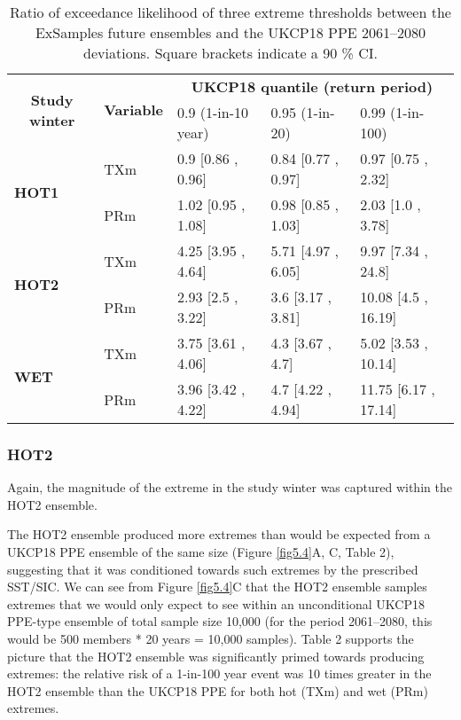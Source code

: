       \begin{table}[h]
        \centering
        \footnotesize
        \begin{tabular}{lllll}
          \toprule
          \multicolumn{1}{c}{\multirow{2}{*}{\textbf{Study winter}}}&\multicolumn{1}{c}{\multirow{2}{*}{\textbf{Variable}}}&\multicolumn{3}{c}{\textbf{UKCP18 quantile (return period)}}\\\cmidrule(lr){3-5}
          \multicolumn{1}{c}{}&\multicolumn{1}{c}{}&\multicolumn{1}{l}{0.9 (1-in-10 year)}&\multicolumn{1}{l}{0.95 (1-in-20)}&0.99 (1-in-100)\\\midrule
          \multirow{2}{*}{\textbf{HOT1}}&TXm&\multicolumn{1}{l}{0.9 {[}0.86 , 0.96{]}}&\multicolumn{1}{l}{0.84 {[}0.77 , 0.97{]}}&0.97 {[}0.75 , 2.32{]}\\
          &PRm&\multicolumn{1}{l}{1.02 {[}0.95 , 1.08{]}}&\multicolumn{1}{l}{0.98 {[}0.85 , 1.03{]}}&2.03 {[}1.0 , 3.78{]}\\\midrule
          \multirow{2}{*}{\textbf{HOT2}}&TXm&\multicolumn{1}{l}{4.25 {[}3.95 , 4.64{]}}&\multicolumn{1}{l}{5.71 {[}4.97 , 6.05{]}}&9.97 {[}7.34 , 24.8{]}\\
          &PRm&\multicolumn{1}{l}{2.93 {[}2.5 , 3.22{]}}&\multicolumn{1}{l}{3.6 {[}3.17 , 3.81{]}}&10.08 {[}4.5 , 16.19{]}\\\midrule
          \multirow{2}{*}{\textbf{WET}}&TXm&\multicolumn{1}{l}{3.75 {[}3.61 , 4.06{]}}&\multicolumn{1}{l}{4.3 {[}3.67 , 4.7{]}}&5.02 {[}3.53 , 10.14{]}\\
          &PRm&\multicolumn{1}{l}{3.96 {[}3.42 , 4.22{]}}&\multicolumn{1}{l}{4.7 {[}4.22 , 4.94{]}}&11.75 {[}6.17 , 17.14{]}\\\bottomrule
          \end{tabular}
        \caption{Ratio of exceedance likelihood of three extreme thresholds between the ExSamples future ensembles and the UKCP18 PPE 2061--2080 deviations. Square brackets indicate a 90 \% CI.}
      \end{table}
      \clearpage

    \subsubsection{HOT2}

      Again, the magnitude of the extreme in the study winter was captured within the HOT2 ensemble.
      
      The HOT2 ensemble produced more extremes than would be expected from a UKCP18 PPE ensemble of the same size (Figure \ref{fig5.4}A, C, Table 2), suggesting that it was conditioned towards such extremes by the prescribed SST/SIC. We can see from Figure \ref{fig5.4}C that the HOT2 ensemble samples extremes that we would only expect to see within an unconditional UKCP18 PPE-type ensemble of total sample size 10,000 (for the period 2061--2080, this would be 500 members * 20 years = 10,000 samples). Table 2 supports the picture that the HOT2 ensemble was significantly primed towards producing extremes: the relative risk of a 1-in-100 year event was 10 times greater in the HOT2 ensemble than the UKCP18 PPE for both hot (TXm) and wet (PRm) extremes.
      
